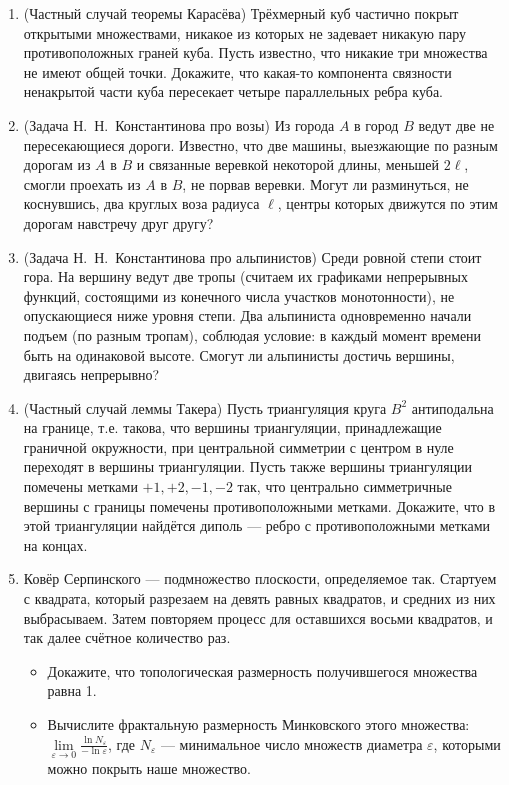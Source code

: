 \documentclass[12pt]{article}
\def\eps{\varepsilon}
\begin{document}
\begin{enumerate}
  \item (Частный случай теоремы Карасёва) Трёхмерный куб частично покрыт открытыми множествами, никакое из которых не задевает никакую пару противоположных граней куба. Пусть известно, что никакие три множества не имеют общей точки. Докажите, что какая-то компонента связности ненакрытой части куба пересекает четыре параллельных ребра куба.

  \item (Задача Н.~Н.~Константинова про возы) Из города $A$ в город $B$ ведут две не пересекающиеся дороги. Известно, что две машины, выезжающие по разным дорогам из $A$ в $B$ и связанные веревкой некоторой длины, меньшей $2\ell$, смогли проехать из $A$ в $B$, не порвав веревки. Могут ли разминуться, не коснувшись, два круглых воза радиуса $\ell$, центры которых движутся по этим дорогам навстречу друг другу?

  \item (Задача Н.~Н.~Константинова про альпинистов) Среди ровной степи стоит гора. На вершину ведут две тропы (считаем их графиками непрерывных функций, состоящими из конечного числа участков монотонности), не опускающиеся ниже уровня степи. Два альпиниста одновременно начали подъем (по разным тропам), соблюдая условие: в каждый момент времени быть на одинаковой высоте. Смогут ли альпинисты достичь вершины, двигаясь непрерывно?

    \item (Частный случай леммы Такера) Пусть триангуляция круга $B^2$ антиподальна на границе, т.е. такова, что вершины триангуляции, принадлежащие граничной окружности, при центральной симметрии с центром в нуле переходят в вершины триангуляции. Пусть также вершины триангуляции помечены метками $+1,+2,-1,-2$ так, что центрально симметричные вершины с границы помечены противоположными метками. Докажите, что в этой триангуляции найдётся диполь --- ребро с противоположными метками на концах.
        
    \item Ковёр Серпинского --- подмножество плоскости, определяемое так. Стартуем с квадрата, который разрезаем на девять равных квадратов, и средних из них выбрасываем. Затем повторяем процесс для оставшихся восьми квадратов, и так далее счётное количество раз. 
        \begin{itemize}
          \item Докажите, что топологическая размерность получившегося множества равна 1.
          \item Вычислите фрактальную размерность Минковского этого множества: $\lim\limits_{\eps \to 0} \frac{\ln N_\eps}{- \ln \eps}$, где $N_\eps$ --- минимальное число множеств диаметра $\eps$, которыми можно покрыть наше множество.
        \end{itemize}


\end{enumerate}
\end{document}
